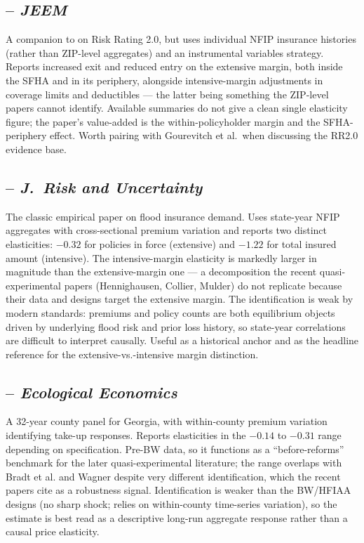 \documentclass[11pt]{article}
\begin{document}
\subsection*{\citet{ortega2025} -- \textit{JEEM}}
A companion to \citet{gourevitch2025} on Risk Rating 2.0, but uses individual
NFIP insurance histories (rather than ZIP-level aggregates) and an instrumental
variables strategy. Reports increased exit and reduced entry on the extensive
margin, both inside the SFHA and in its periphery, alongside intensive-margin
adjustments in coverage limits and deductibles --- the latter being something
the ZIP-level papers cannot identify. Available summaries do not give a clean
single elasticity figure; the paper's value-added is the within-policyholder
margin and the SFHA-periphery effect. Worth pairing with Gourevitch et al.\
when discussing the RR2.0 evidence base.

\subsection*{\citet{browne2000} -- \textit{J.~Risk and Uncertainty}}
The classic empirical paper on flood insurance demand. Uses state-year NFIP
aggregates with cross-sectional premium variation and reports two distinct
elasticities: $-0.32$ for policies in force (extensive) and $-1.22$ for total
insured amount (intensive). The intensive-margin elasticity is markedly larger
in magnitude than the extensive-margin one --- a decomposition the recent
quasi-experimental papers (Hennighausen, Collier, Mulder) do not replicate
because their data and designs target the extensive margin. The identification
is weak by modern standards: premiums and policy counts are both equilibrium
objects driven by underlying flood risk and prior loss history, so
state-year correlations are difficult to interpret causally. Useful as a
historical anchor and as the headline reference for the extensive-vs.-intensive
margin distinction.

\subsection*{\citet{atreya2015} -- \textit{Ecological Economics}}
A 32-year county panel for Georgia, with within-county premium variation
identifying take-up responses. Reports elasticities in the $-0.14$ to $-0.31$
range depending on specification. Pre-BW data, so it functions as a
``before-reforms'' benchmark for the later quasi-experimental literature; the
range overlaps with Bradt et al. and Wagner despite very different
identification, which the recent papers cite as a robustness signal.
Identification is weaker than the BW/HFIAA designs (no sharp shock; relies on
within-county time-series variation), so the estimate is best read as a
descriptive long-run aggregate response rather than a causal price elasticity.
\end{document}
